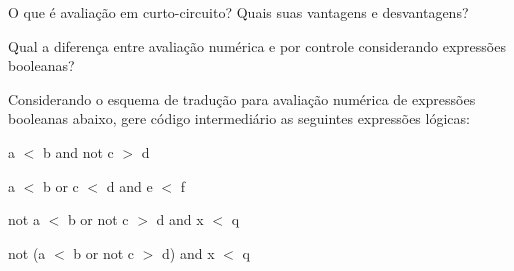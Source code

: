 \documentclass{compiladores}
\begin{document}
\begin{listanumerada}
\item O que é avaliação em curto-circuito? Quais suas vantagens e desvantagens?

\item Qual a diferença entre avaliação numérica e por controle considerando expressões booleanas?

\item \label{x} Considerando o esquema de tradução para avaliação numérica de
  expressões booleanas abaixo, gere código intermediário as seguintes
  expressões lógicas:
  \begin{lista}
  \item a $<$ b and not c $>$ d
  \item a $<$ b or c $<$ d and e $<$ f
  \item not a $<$ b or not c $>$ d and x $<$ q
  \item not (a $<$ b or not c $>$ d) and x $<$ q


\end{lista}
\end{listanumerada}
\end{document}
